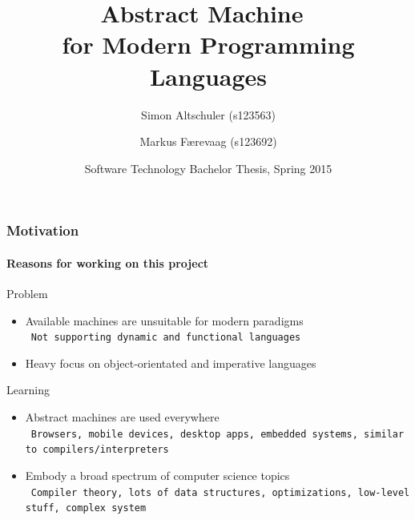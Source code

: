 \documentclass{beamer}
\title{Abstract Machine~\\for Modern Programming Languages}
\author[Altschuler, Færevaag]{Simon Altschuler (s123563) \and Markus Færevaag (s123692)}
\date{Software Technology Bachelor Thesis, Spring 2015}
\newcommand{\n}[1]{\leavevmode\\~\texttt{\color{red}\tiny #1}}
\begin{document}
\frame{\titlepage}

\begin{frame}
  \frametitle{Motivation}
  \framesubtitle{Reasons for working on this project}

  Problem
  \begin{itemize}
  \item Available machines are unsuitable for modern paradigms
    \n{Not supporting dynamic and functional languages}
  \item Heavy focus on object-orientated and imperative languages
  \end{itemize}

  \pause{}

  \vspace{20pt}
  Learning
  \begin{itemize}
  \item Abstract machines are used everywhere
    \n{Browsers, mobile devices, desktop apps, embedded systems, similar to compilers/interpreters}
  \item Embody a broad spectrum of computer science topics
    \n{Compiler theory, lots of data structures, optimizations, low-level stuff, complex system}
  \end{itemize}

\end{frame}
\end{document}
